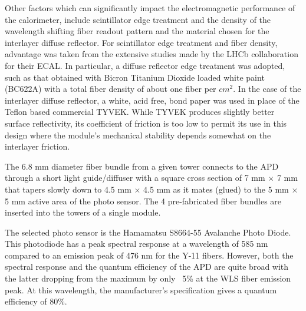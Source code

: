 Other factors which can significantly impact the electromagnetic performance of the calorimeter, 
include scintillator edge treatment and the density of the wavelength shifting fiber readout pattern and the material 
chosen for the interlayer diffuse reflector. For scintillator edge treatment and fiber density, advantage was taken from the 
extensive studies made by the LHCb collaboration for their ECAL. In particular, a diffuse reflector edge treatment was adopted, 
such as that obtained with Bicron Titanium Dioxide loaded white paint (BC622A) with a total fiber density of about one fiber per $cm^2$. 
In the case of the interlayer diffuse reflector, a white, acid free, bond paper was used in place of the Teflon based commercial TYVEK. 
While TYVEK produces slightly better surface reflectivity, its coefficient of friction is too low to permit its use in this 
design where the module's mechanical stability depends somewhat on the interlayer friction.
 
The 6.8 mm diameter fiber bundle from a given tower connects to the APD through a short light guide/diffuser 
with a square cross section of 7 mm $\times$ 7 mm that tapers slowly down to 4.5 mm $\times$ 4.5 mm as it mates (glued) 
to the 5 mm $\times$ 5 mm active area of the photo sensor. 
The 4 pre-fabricated fiber bundles are inserted into the 
towers of a single module. 

The selected photo sensor is the Hamamatsu S8664-55 Avalanche Photo Diode.
This photodiode has a peak spectral response at a wavelength of 585 nm compared to an emission peak of 476 nm for the Y-11 fibers. 
However, both the spectral response and the quantum efficiency of the APD are quite broad with the latter dropping from the maximum by only ~5\% at the WLS fiber emission peak. 
At this wavelength, the manufacturer's specification gives a quantum efficiency of 80\%. 
